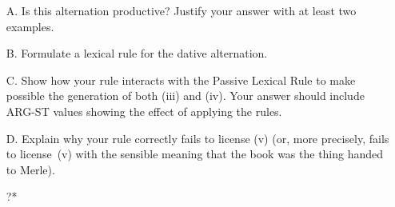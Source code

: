 \documentclass[a4paper,landscape,headrule,footrule]{foils}
\begin{document}
\begin{exe}
 
 
\end{exe}

\begin{itemize}
\item[A.] Is this alternation productive?  Justify your answer with at
  least two examples.
\item[B.] Formulate a  lexical rule for the dative
  alternation. 
\newpage
\item[C.] Show how your rule interacts with the Passive Lexical Rule
  to make possible the generation of both (iii) and (iv).  Your answer
  should include ARG-ST values showing the effect of applying the
  rules. 
\begin{exe}
 
  
\end{exe}
\item[D.] Explain why your rule correctly fails to license (v) (or,
more precisely, fails to license~(v) with the sensible meaning
that the book was the thing handed to Merle).
\begin{exe}
 ?*
\end{exe}
\end{itemize}
\end{document}
